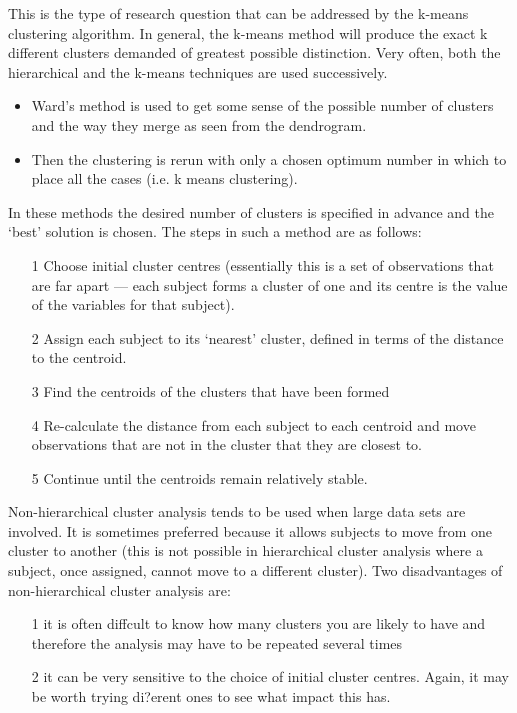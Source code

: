 \documentclass[a4paper,12pt]{article}
\begin{document}
This is the type of research question that can be addressed by the k-means clustering algorithm. In general, the k-means method will produce the exact k different clusters demanded of greatest possible distinction. Very often, both the hierarchical and the k-means techniques are used successively.
\begin{itemize}
	\item Ward's method is used to get some sense of the possible number of clusters and the way they merge as seen from the dendrogram.
	\item Then the clustering is rerun with only a chosen optimum number in which to place all
	the cases (i.e. k means clustering).
\end{itemize}

In these methods the desired number of clusters is specified in advance and the `best' solution
is chosen. The steps in such a method are as follows:
\begin{itemize}
	\item[1] Choose initial cluster centres (essentially this is a set of observations that are far apart
	— each subject forms a cluster of one and its centre is the value of the variables for
	that subject).
	\item[2] Assign each subject to its `nearest' cluster, defined in terms of the distance to the
	centroid.
	\item[3] Find the centroids of the clusters that have been formed
	\item[4] Re-calculate the distance from each subject to each centroid and move observations that
	are not in the cluster that they are closest to.
	\item[5] Continue until the centroids remain relatively stable.
\end{itemize}

Non-hierarchical cluster analysis tends to be used when large data sets are involved. It is
sometimes preferred because it allows subjects to move from one cluster to another (this is
not possible in hierarchical cluster analysis where a subject, once assigned, cannot move to a
different cluster). Two disadvantages of non-hierarchical cluster analysis are: 
\begin{itemize}
	\item[1]it is often
	diffcult to know how many clusters you are likely to have and therefore the analysis may have
	to be repeated several times 
	\item[2] it can be very sensitive to the choice of initial cluster centres. Again, it may be worth trying di?erent ones to see what impact this has.
\end{itemize}
\end{document}

